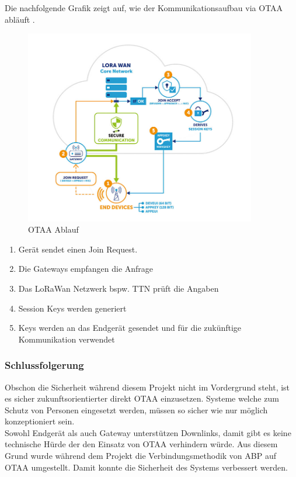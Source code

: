 \documentclass[11pt,english,german]{report}
\theoremstyle{definition}
\begin{document}
\newpage
\noindent
Die nachfolgende Grafik zeigt auf, wie der Kommunikationsaufbau via OTAA abläuft \cite{jaguar}.
\begin{figure}[H]
	\centering
	\includegraphics[width=0.9\textwidth]{img/lora/otaa_schema.png}
	\caption[OTAA Ablauf]
	{OTAA Ablauf}
\end{figure}

\begin{enumerate}
	\item Gerät sendet einen Join Request.
	\item Die Gateways empfangen die Anfrage
	\item Das LoRaWan Netzwerk  bspw. TTN prüft die Angaben
	\item Session Keys werden generiert
	\item Keys werden an das Endgerät gesendet und für die zukünftige Kommunikation verwendet
\end{enumerate}

\newpage
\subsubsection{Schlussfolgerung}
Obschon die Sicherheit während diesem Projekt nicht im Vordergrund steht, ist es sicher zukunftsorientierter direkt OTAA einzusetzen. Systeme welche zum Schutz von Personen eingesetzt werden, müssen so sicher wie nur möglich konzeptioniert sein.\\[0.3cm]
Sowohl Endgerät als auch Gateway unterstützen Downlinks, damit gibt es keine technische Hürde der den Einsatz von OTAA verhindern würde. Aus diesem Grund wurde während dem Projekt die Verbindungsmethodik von ABP auf OTAA umgestellt. Damit konnte die Sicherheit des Systems verbessert werden.
\end{document}

